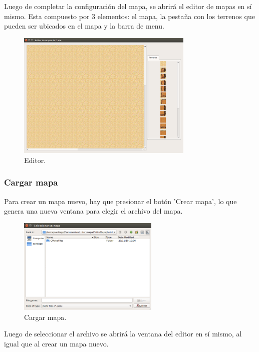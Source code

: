 \documentclass[titlepage,a4paper,12pt]{article}
\begin{document}
Luego de completar la configuración del mapa, se abrirá el editor de mapas en sí mismo. Esta compuesto por 3 elementos: el mapa, la pestaña con los terrenos que pueden ser ubicados en el mapa y la barra de menu.\\

\begin{figure}[H]
	\centering
	\includegraphics[width=0.75\textwidth]{../imagenes/editor_ui.png}
	\caption{\label{fig:menu_editor} Editor.}
\end{figure}

\subsubsection{Cargar mapa}

Para crear un mapa nuevo, hay que presionar el botón 'Crear mapa', lo que genera una nueva ventana para elegir el archivo del mapa.\\

\begin{figure}[H]
	\centering
	\includegraphics[width=0.6\textwidth]{../imagenes/cargar_mapa.png}
	\caption{\label{fig:menu_editor} Cargar mapa.}
\end{figure}

Luego de seleccionar el archivo se abrirá la ventana del editor en sí mismo, al igual que al crear un mapa nuevo.\\
\end{document}
